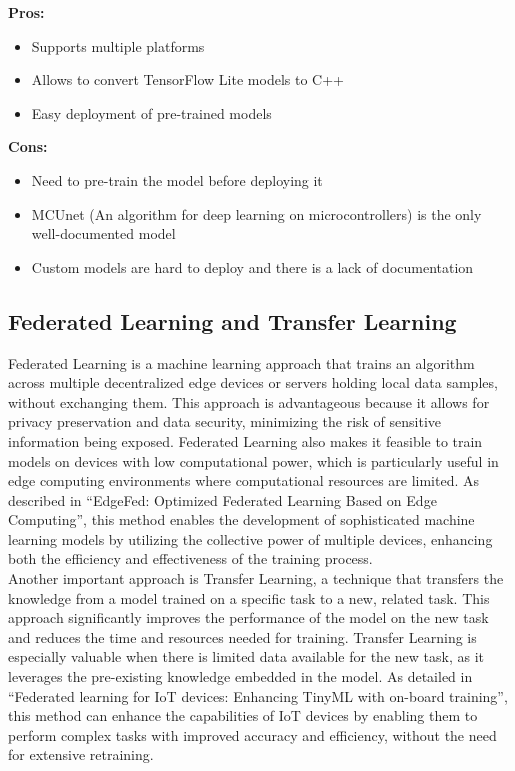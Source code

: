\textbf{Pros:}
\begin{itemize}
    \item Supports multiple platforms
    \item Allows to convert TensorFlow Lite models to C++
    \item Easy deployment of pre-trained models
\end{itemize}
\textbf{Cons:}
\begin{itemize}
    \item Need to pre-train the model before deploying it
    \item MCUnet\cite{lin2020mcunet} (An algorithm for deep learning on microcontrollers) is the only well-documented model
    \item Custom models are hard to deploy and there is a lack of documentation
\end{itemize}



\subsection*{Federated Learning and Transfer Learning}
Federated Learning is a machine learning approach that trains an algorithm across multiple decentralized edge devices or servers holding local data samples, without exchanging them. This approach is advantageous because it allows for privacy preservation and data security, minimizing the risk of sensitive information being exposed. Federated Learning also makes it feasible to train models on devices with low computational power, which is particularly useful in edge computing environments where computational resources are limited. As described in \enquote{EdgeFed: Optimized Federated Learning Based on Edge Computing}\cite{9260194}, this method enables the development of sophisticated machine learning models by utilizing the collective power of multiple devices, enhancing both the efficiency and effectiveness of the training process.
\\
Another important approach is Transfer Learning, a technique that transfers the knowledge from a model trained on a specific task to a new, related task. This approach significantly improves the performance of the model on the new task and reduces the time and resources needed for training. Transfer Learning is especially valuable when there is limited data available for the new task, as it leverages the pre-existing knowledge embedded in the model. As detailed in \enquote{Federated learning for IoT devices: Enhancing TinyML with on-board training}\cite{FICCO2024102189}, this method can enhance the capabilities of IoT devices by enabling them to perform complex tasks with improved accuracy and efficiency, without the need for extensive retraining.

